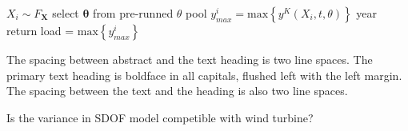 \documentclass[twocolumn,10pt]{asme2e}
\newcommand{\bs}[1]{\boldsymbol{#1}}
\begin{document}
\begin{algorithm}
  \begin{algorithmic}
	  \State $X_i \sim F_{\bs{X}}$
	  \State select $\bs{\theta}$ from pre-runned $\theta$ pool
	  \State $y_{max}^i = \mathrm{max}\left\{y^K (X_i, t,\theta) \right\}$
	\EndFor
	 year return load = $\mathrm{max } \left\{ y_{max}^i \right\}$
  \end{algorithmic}
\end{algorithm}
The spacing between abstract and the text heading is two line spaces.  The primary text heading is  boldface in all capitals, flushed left with the left margin.  The spacing between the  text and the heading is also two line spaces.

Is the variance in SDOF model competible with wind turbine?


\end{document}
